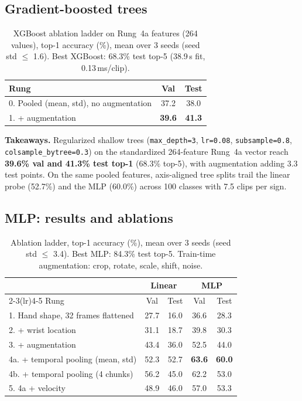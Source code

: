 \documentclass[10pt]{article}
\begin{document}
\subsection{Gradient-boosted trees}\label{sec:trees}

\begin{table}[h]
\centering\footnotesize
\begin{tabular}{lcc}
\toprule
Rung & Val & Test \\
\midrule
0. Pooled (mean, std), no augmentation & 37.2 & 38.0 \\
1. + augmentation                      & \textbf{39.6} & \textbf{41.3} \\
\bottomrule
\end{tabular}
\caption{XGBoost ablation ladder on Rung~4a features (264 values), top-1 accuracy (\%), mean over 3 seeds (seed std $\le$ 1.6). Best XGBoost: 68.3\% test top-5 (38.9\,s fit, 0.13\,ms/clip).}
\label{tab:trees}
\end{table}

\textbf{Takeaways.} Regularized shallow trees (\texttt{max\_depth=3}, \texttt{lr=0.08}, \texttt{subsample=0.8}, \texttt{colsample\_bytree=0.3}) on the standardized 264-feature Rung~4a vector reach \textbf{39.6\% val and 41.3\% test top-1} (68.3\% top-5), with augmentation adding 3.3 test points. On the same pooled features, axis-aligned tree splits trail the linear probe (52.7\%) and the MLP (60.0\%) across 100 classes with 7.5 clips per sign.

\subsection{MLP: results and ablations}\label{sec:ablation}

\begin{table}[h]
\centering\footnotesize
\begin{tabular}{lcccc}
\toprule
 & \multicolumn{2}{c}{Linear} & \multicolumn{2}{c}{MLP} \\
\cmidrule(lr){2-3}\cmidrule(lr){4-5}
Rung & Val & Test & Val & Test \\
\midrule
1. Hand shape, 32 frames flattened & 27.7 & 16.0 & 36.6 & 28.3 \\
2. + wrist location               & 31.1 & 18.7 & 39.8 & 30.3 \\
3. + augmentation                 & 43.4 & 36.0 & 52.5 & 44.0 \\
4a. + temporal pooling (mean, std) & 52.3 & 52.7 & \textbf{63.6} & \textbf{60.0} \\
4b. + temporal pooling (4 chunks)  & 56.2 & 45.0 & 62.2 & 53.0 \\
5. 4a + velocity                  & 48.9 & 46.0 & 57.0 & 53.3 \\
\bottomrule
\end{tabular}
\caption{Ablation ladder, top-1 accuracy (\%), mean over 3 seeds (seed std $\le$ 3.4). Best MLP: 84.3\% test top-5. Train-time augmentation: crop, rotate, scale, shift, noise.}
\label{tab:ladder}
\end{table}
\end{document}
